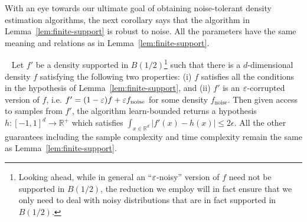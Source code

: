 With an eye towards our ultimate goal of obtaining noise-tolerant density estimation algorithms, the next corollary says that the algorithm in Lemma~\ref{lem:finite-support} is robust to noise. All the parameters have the same meaning and relations as in Lemma~\ref{lem:finite-support}.  

\begin{corollary}~\label{corr:agnostic}
Let $f'$ be a density supported in $B(1/2)$\footnote{Looking ahead, while in general an  ``$\varepsilon$-noisy'' version of $f$ need not be supported in $B(1/2)$, the reduction we employ will in fact ensure that we only need to deal with noisy distributions that are in fact supported in $B(1/2).$
} such that there is a $d$-dimensional density $f$ satisfying the following two properties: (i) $f$ satisfies all the conditions in the hypothesis of Lemma~\ref{lem:finite-support}, and (ii) $f'$ is an $\varepsilon$-corrupted version of $f$, i.e. $f'=(1-\varepsilon)f + \varepsilon f_{\mathrm{noise}}$ for some density $f_{\mathrm{noise}}.$ 
Then given access to samples from $f'$,  the algorithm
 \textsf{learn-bounded}  returns a hypothesis $h: [-1,1]^d \rightarrow \mathbb{R}^+$ which satisfies $\int_{x \in \mathbb{R}^d} |f'(x) - h(x)| \le 2 \epsilon$. All the other guarantees including the sample complexity and time complexity remain the same as Lemma~\ref{lem:finite-support}. 
\end{corollary}

